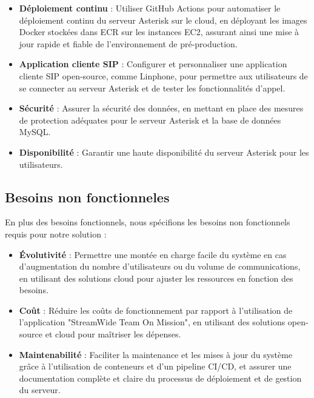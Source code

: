 \begin{itemize}
    \item \textbf{Déploiement continu} :
    Utiliser GitHub Actions pour automatiser le déploiement continu du serveur Asterisk sur le cloud, en déployant les images Docker stockées dans ECR sur les instances EC2, assurant ainsi une mise à jour rapide et fiable de l'environnement de pré-production.

    \item \textbf{Application cliente SIP} :
    Configurer et personnaliser une application cliente SIP open-source, comme Linphone, pour permettre aux utilisateurs de se connecter au serveur Asterisk et de tester les fonctionnalités d'appel.

        \item \textbf{Sécurité} :
    Assurer la sécurité des données, en mettant en place des mesures de protection adéquates pour le serveur Asterisk et la base de données MySQL.
    
    \item \textbf{Disponibilité} :
    Garantir une haute disponibilité du serveur Asterisk pour les utilisateurs.
\end{itemize}

\subsection{Besoins non fonctionneles}
En plus des besoins fonctionnels, nous spécifions les besoins non fonctionnels requis pour notre solution :

\begin{itemize}


    \item \textbf{Évolutivité} :
    Permettre une montée en charge facile du système en cas d'augmentation du nombre d'utilisateurs ou du volume de communications, en utilisant des solutions cloud pour ajuster les ressources en fonction des besoins.

    \item \textbf{Coût} :
    Réduire les coûts de fonctionnement par rapport à l'utilisation de l'application "StreamWide Team On Mission", en utilisant des solutions open-source et cloud pour maîtriser les dépenses.

    \item \textbf{Maintenabilité} :
    Faciliter la maintenance et les mises à jour du système grâce à l'utilisation de conteneurs et d'un pipeline CI/CD, et assurer une documentation complète et claire du processus de déploiement et de gestion du serveur.
\end{itemize}

